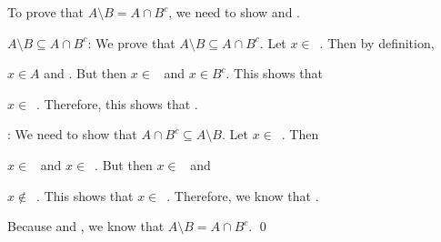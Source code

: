 \documentclass[11pt,letterpaper]{article}
\begin{document}
To prove that $A \setminus B= A \cap B^c$, we need to show  and . \par\vspace{3\baselineskip}


$A \setminus B \subseteq A \cap B^c$: We prove that $A \setminus B \subseteq A \cap B^c$. Let $x \in$~. Then by definition, \pspace

$x \in A$ and . But then $x \in$~ and $x \in B^c$. This shows that \pspace

$x \in$~. Therefore, this shows that . \par\vspace{3\baselineskip}


: We need to show that $A \cap B^c \subseteq A \setminus B$. Let $x \in$~. Then \pspace

$x \in$~ and $x \in$~. But then $x \in$~ and \pspace

$x \notin$~. This shows that $x \in$~. Therefore, we know that . \par\vspace{3\baselineskip}

Because  and , we know that $A \setminus B= A \cap B^c$. \qed
\end{document}
